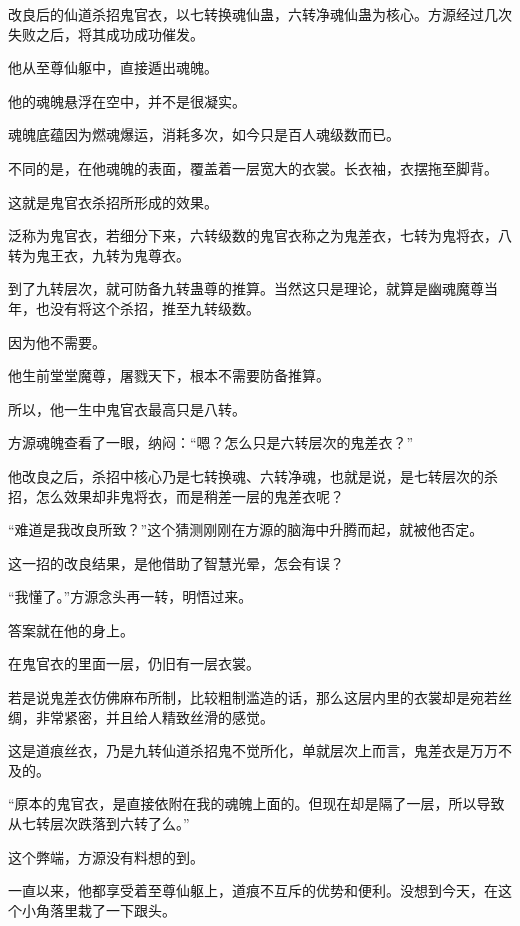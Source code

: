 
\begin{this_body}



改良后的仙道杀招鬼官衣，以七转换魂仙蛊，六转净魂仙蛊为核心。方源经过几次失败之后，将其成功成功催发。

他从至尊仙躯中，直接遁出魂魄。

他的魂魄悬浮在空中，并不是很凝实。

魂魄底蕴因为燃魂爆运，消耗多次，如今只是百人魂级数而已。

不同的是，在他魂魄的表面，覆盖着一层宽大的衣裳。长衣袖，衣摆拖至脚背。

这就是鬼官衣杀招所形成的效果。

泛称为鬼官衣，若细分下来，六转级数的鬼官衣称之为鬼差衣，七转为鬼将衣，八转为鬼王衣，九转为鬼尊衣。

到了九转层次，就可防备九转蛊尊的推算。当然这只是理论，就算是幽魂魔尊当年，也没有将这个杀招，推至九转级数。

因为他不需要。

他生前堂堂魔尊，屠戮天下，根本不需要防备推算。

所以，他一生中鬼官衣最高只是八转。

方源魂魄查看了一眼，纳闷：“嗯？怎么只是六转层次的鬼差衣？”

他改良之后，杀招中核心乃是七转换魂、六转净魂，也就是说，是七转层次的杀招，怎么效果却非鬼将衣，而是稍差一层的鬼差衣呢？

“难道是我改良所致？”这个猜测刚刚在方源的脑海中升腾而起，就被他否定。

这一招的改良结果，是他借助了智慧光晕，怎会有误？

“我懂了。”方源念头再一转，明悟过来。

答案就在他的身上。

在鬼官衣的里面一层，仍旧有一层衣裳。

若是说鬼差衣仿佛麻布所制，比较粗制滥造的话，那么这层内里的衣裳却是宛若丝绸，非常紧密，并且给人精致丝滑的感觉。

这是道痕丝衣，乃是九转仙道杀招鬼不觉所化，单就层次上而言，鬼差衣是万万不及的。

“原本的鬼官衣，是直接依附在我的魂魄上面的。但现在却是隔了一层，所以导致从七转层次跌落到六转了么。”

这个弊端，方源没有料想的到。

一直以来，他都享受着至尊仙躯上，道痕不互斥的优势和便利。没想到今天，在这个小角落里栽了一下跟头。


\end{this_body}

